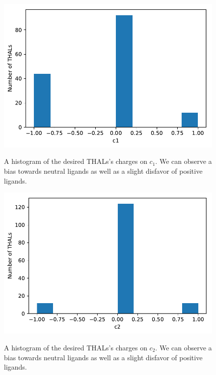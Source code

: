 \begin{figure}[ht]
\begin{minipage}[b]{0.5\linewidth}
			\includegraphics[width=.9\linewidth]{img/thal_ss_hist_c1.pdf} 
			\caption{A histogram of the desired THALs's charges on $c_1$. We can observe a bias towards neutral ligands as well as a slight disfavor of positive ligands.} 
			\label{fig:thalhist_c1}
			\vspace{4ex}
		\end{minipage}%
		\begin{minipage}[b]{0.5\linewidth}
			\centering
			\includegraphics[width=.9\linewidth]{img/thal_ss_hist_c2.pdf} 
			\caption{A histogram of the desired THALs's charges on $c_2$. We can observe a bias towards neutral ligands as well as a slight disfavor of positive ligands.} 
			\vspace{4ex}
			\label{fig:thalhist_c2}
		\end{minipage}
\end{figure}

